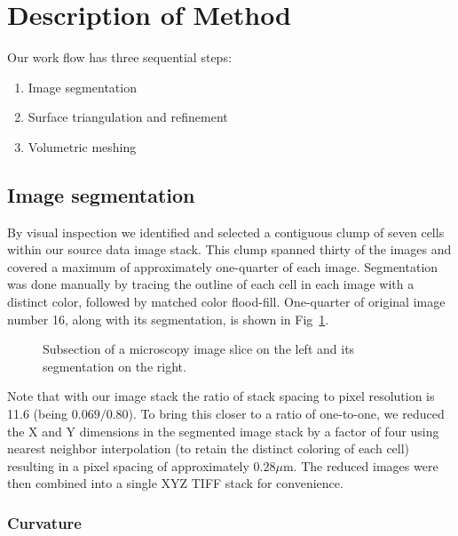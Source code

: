 \documentclass[10pt,letterpaper]{article}
\begin{document}
\section*{Description of Method}

Our work flow has three sequential steps:
\begin{enumerate}
\item Image segmentation
\item Surface triangulation and refinement
\item Volumetric meshing
\end{enumerate}

\subsection*{Image segmentation}

By visual inspection we identified and selected a contiguous clump of seven cells within our source data image stack.  This clump spanned thirty of the images and covered a maximum of approximately one-quarter of each image. Segmentation was done manually by tracing the outline of each cell in each image with a distinct color, followed by matched color flood-fill. One-quarter of original image number 16, along with its segmentation, is shown in Fig~\ref{fig:slice}.\\

\begin{figure}[!h]
\caption{Subsection of a microscopy image slice on the left and its segmentation on the right.}
\label{fig:slice}
\end{figure}

Note that with our image stack the ratio of stack spacing to pixel resolution is 11.6 (being $0.069/0.80$). To bring this closer to a ratio of one-to-one, we reduced the X and Y dimensions in the segmented image stack by a factor of four using nearest neighbor interpolation (to retain the distinct coloring of each cell) resulting in a pixel spacing of approximately $0.28\mu\textrm{m}$.  The reduced images were then combined into a single XYZ TIFF stack for convenience.\\

\subsubsection*{Curvature}
\end{document}
